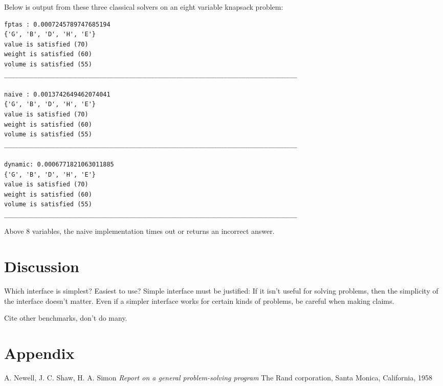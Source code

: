 \documentclass{article}
\begin{document}
Below is output from these three classical solvers on an eight variable knapsack problem:

\begin{verbatim}
fptas : 0.0007245789747685194
{'G', 'B', 'D', 'H', 'E'}
value is satisfied (70)
weight is satisfied (60)
volume is satisfied (55)
________________________________________________________________________________

naive : 0.0013742649462074041
{'G', 'B', 'D', 'H', 'E'}
value is satisfied (70)
weight is satisfied (60)
volume is satisfied (55)
________________________________________________________________________________

dynamic: 0.0006771821063011885
{'G', 'B', 'D', 'H', 'E'}
value is satisfied (70)
weight is satisfied (60)
volume is satisfied (55)
________________________________________________________________________________
\end{verbatim}

Above 8 variables, the naive implementation times out or returns an incorrect answer.

\section{Discussion}

Which interface is simplest? Easiest to use?
Simple interface must be justified: If it isn't useful for solving problems, then the simplicity of the interface doesn't matter.
Even if a simpler interface works for certain kinds of problems, be careful when making claims.

Cite other benchmarks, don't do many.

\section{Appendix}

\begin{thebibliography}{9}
        A. Newell, J. C. Shaw, H. A. Simon
        \textit{Report on a general problem-solving program}
        The Rand corporation, Santa Monica, California, 1958
\end{thebibliography}
\end{document}
